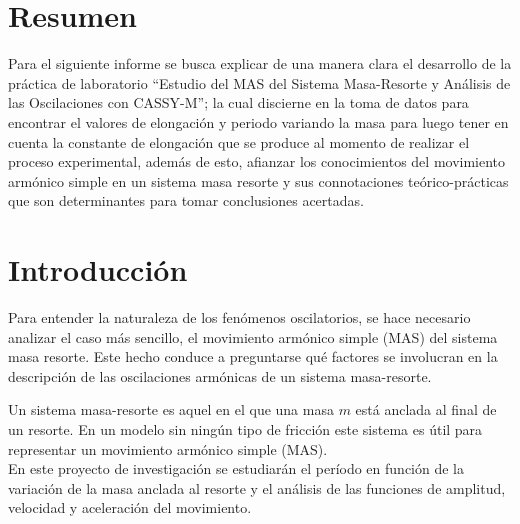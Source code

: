 \documentclass[spanish,notitlepage,letterpaper, 12pt]{article}
\begin{document}

\tableofcontents

\newpage

\section{Resumen}
Para el siguiente informe se busca explicar de una manera clara el desarrollo de la práctica de laboratorio “Estudio del MAS del Sistema Masa-Resorte y Análisis de las Oscilaciones con CASSY-M”; la cual discierne en la toma de datos para encontrar el valores de elongación y periodo variando la masa para luego tener en cuenta la constante de elongación que se produce al momento de realizar el proceso experimental, además de esto, afianzar los conocimientos del movimiento armónico simple en un sistema masa resorte y sus connotaciones teórico-prácticas que son determinantes para tomar conclusiones acertadas. 

\section{Introducción}
Para entender la naturaleza de los fenómenos oscilatorios, se hace necesario analizar el caso más sencillo, el movimiento armónico simple (MAS) del sistema masa resorte. Este hecho conduce a preguntarse qué factores se involucran en la descripción de las oscilaciones armónicas de un sistema masa-resorte. 

Un sistema masa-resorte es aquel en el que una masa $m$ está anclada al final de un resorte. En un modelo sin ningún tipo de fricción este sistema es útil para representar un movimiento armónico simple (MAS). \cite{serway_jewett_2017}\\

En este proyecto de investigación se estudiarán el período en función de la variación de la masa anclada al resorte y el análisis de las funciones de amplitud, velocidad y aceleración del movimiento.
\end{document}
